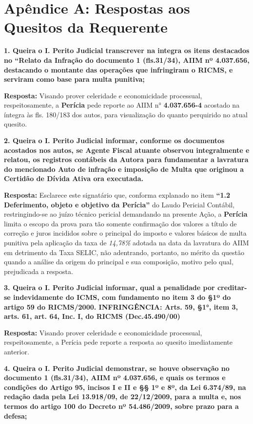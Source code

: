 \hypertarget{ApB}{
\section{Apêndice A: Respostas aos Quesitos da Requerente}}

\textbf{1.	Queira o I. Perito Judicial transcrever na integra os itens destacados no “Relato da Infração do documento 1 (fls.31/34), AIIM nº 4.037.656, destacando o montante das operações que infringiram o RICMS, e serviram como base para multa punitiva;}

\textbf{Resposta:} Visando prover celeridade e economicidade processual, respeitosamente, a \textbf{Perícia} pede reporte ao AIIM n° \textbf{4.037.656-4} acostado na íntegra às fls. 180/183 dos autos, para visualização do quanto perquirido no atual quesito.

\textbf{2.	Queira o I. Perito Judicial informar, conforme os documentos acostados nos autos, se Agente Fiscal atuante observou integralmente e relatou, os registros contábeis da Autora para fundamentar a lavratura do mencionado Auto de infração e imposição de Multa que originou a Certidão de Dívida Ativa ora executada.}

\textbf{Resposta:} Esclarece este signatário que, conforma explanado no item \textbf{“1.2 Deferimento, objeto e objetivo da Perícia”} do Laudo Pericial Contábil, restringindo-se ao juízo técnico pericial demandando na presente Ação, a \textbf{Perícia} limita o escopo da prova para tão somente confirmação dos valores a título de correção e juros incididos sobre o principal do imposto e valores básicos de multa punitiva pela aplicação da taxa de \emph{14,78\%} adotada na data da lavratura do AIIM em detrimento da Taxa SELIC, não adentrando, portanto, no mérito da questão quando a análise da origem do principal e sua composição, motivo pelo qual, prejudicada a resposta.

\textbf{3.	Queira o I. Perito Judicial informar, qual a penalidade por creditar-se indevidamente do ICMS, com fundamento no item 3 do §1º do artigo 59 do RICMS/2000. INFRINGÊNCIA: Arts. 59, §1°, item 3, arts. 61, art. 64, Inc. I, do RICMS (Dec.45.490/00)}

\textbf{Resposta:} Visando prover celeridade e economicidade processual, respeitosamente, a Perícia pede reporte a resposta ao quesito imediatamente anterior.

\textbf{4.	Queira o I. Perito Judicial demonstrar, se houve observação no documento 1 (fls.31/34), AIIM nº 4.037.656, e quais os termos e condições do Artigo 95, incisos I e II e §§ 1º e 8º, da Lei 6.374/89, na redação dada pela Lei 13.918/09, de 22/12/2009, para a multa e, nos termos do artigo 100 do Decreto nº 54.486/2009, sobre prazo para a defesa;}

